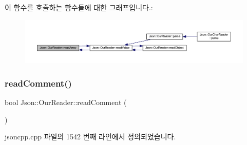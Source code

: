 이 함수를 호출하는 함수들에 대한 그래프입니다.\+:\nopagebreak
\begin{figure}[H]
\begin{center}
\leavevmode
\includegraphics[width=350pt]{class_json_1_1_our_reader_a0b9f58faf4212c6ecb5d8e2a1ac10257_icgraph}
\end{center}
\end{figure}
\mbox{\label{class_json_1_1_our_reader_a90f6bb9e55b2bc3d6c1880809495c222}} 
\subsubsection{\texorpdfstring{read\+Comment()}{readComment()}}
{\footnotesize\ttfamily bool Json\+::\+Our\+Reader\+::read\+Comment (\begin{DoxyParamCaption}{ }\end{DoxyParamCaption})\hspace{0.3cm}{\ttfamily [private]}}



jsoncpp.\+cpp 파일의 1542 번째 라인에서 정의되었습니다.


